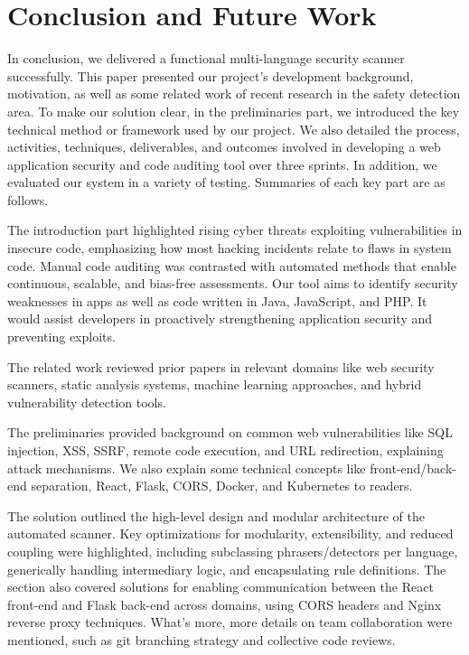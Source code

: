 \documentclass[journal]{IEEEtran}
\begin{document}
\section{Conclusion and Future Work}
\noindent In conclusion, we delivered a functional multi-language security scanner successfully. This paper presented our project's development background, motivation, as well as some related work of recent research in the safety detection area. To make our solution clear, in the preliminaries part, we introduced the key technical method or framework used by our project. We also detailed the process, activities, techniques, deliverables, and outcomes involved in developing a web application security and code auditing tool over three sprints. In addition, we evaluated our system in a variety of testing. Summaries of each key part are as follows.

The introduction part highlighted rising cyber threats exploiting vulnerabilities in insecure code, emphasizing how most hacking incidents relate to flaws in system code. Manual code auditing was contrasted with automated methods that enable continuous, scalable, and bias-free assessments. Our tool aims to identify security weaknesses in apps as well as code written in Java, JavaScript, and PHP. It would assist developers in proactively strengthening application security and preventing exploits.

The related work reviewed prior papers in relevant domains like web security scanners, static analysis systems, machine learning approaches, and hybrid vulnerability detection tools.

The preliminaries provided background on common web vulnerabilities like SQL injection, XSS, SSRF, remote code execution, and URL redirection, explaining attack mechanisms. We also explain some technical concepts like front-end/back-end separation, React, Flask, CORS, Docker, and Kubernetes to readers.

The solution outlined the high-level design and modular architecture of the automated scanner. Key optimizations for modularity, extensibility, and reduced coupling were highlighted, including subclassing phrasers/detectors per language, generically handling intermediary logic, and encapsulating rule definitions. The section also covered solutions for enabling communication between the React front-end and Flask back-end across domains, using CORS headers and Nginx reverse proxy techniques. What's more, more details on team collaboration were mentioned, such as git branching strategy and collective code reviews.
\end{document}
